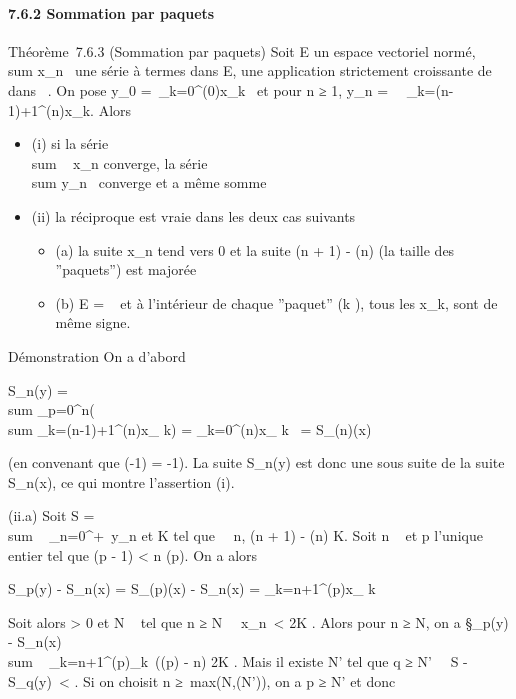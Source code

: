 \documentclass[]{article}
\begin{document}
\paragraph{7.6.2 Sommation par paquets}

Théorème~7.6.3 (Sommation par paquets) Soit E un espace vectoriel normé,
\\sum  x_n~ une
série à termes dans E, \phi une application strictement croissante de ~
dans ~. On pose y_0 =\
\sum  _k=0^\phi(0)x_k~ et
pour n ≥ 1, y_n =\
\sum ~
_k=\phi(n-1)+1^\phi(n)x_k. Alors

\begin{itemize}
\itemsep1pt\parskip0pt
\item
  (i) si la série \\sum ~
  x_n converge, la série
  \\sum  y_n~
  converge et a même somme
\item
  (ii) la réciproque est vraie dans les deux cas suivants

  \begin{itemize}
  \itemsep1pt\parskip0pt
  \item
    (a) la suite x_n tend vers 0 et la suite \phi(n + 1) - \phi(n)
    (la taille des ''paquets'') est majorée
  \item
    (b) E = ~ et à l'intérieur de chaque ''paquet'' (k ), tous les x_k, sont de même signe.
  \end{itemize}
\end{itemize}

Démonstration On a d'abord

S_n(y) = \\sum
_p=0^n(\\sum
_k=\phi(n-1)+1^\phi(n)x_ k) =
\sum _k=0^\phi(n)x_ k~ =
S_\phi(n)(x)

(en convenant que \phi(-1) = -1). La suite S_n(y) est donc une
sous suite de la suite S_n(x), ce qui montre l'assertion (i).

(ii.a) Soit S = \\sum ~
_n=0^+\infty~y_n et K tel que
\forall~~n, \phi(n + 1) - \phi(n) \leq K. Soit n \in {}~ et p
l'unique entier tel que \phi(p - 1) < n \leq \phi(p). On a alors

S_p(y) - S_n(x) = S_\phi(p)(x) - S_n(x)
= \sum _k=n+1^\phi(p)x_ k~

Soit alors \epsilon > 0 et N \in {}~ tel que n ≥ N
\rigtharrow~_n\
< \epsilon {}K . Alors pour n ≥ N, on a
\S_p(y) -
S_n(x)\
\leq\\sum ~
_k=n+1^\phi(p)\x_k\
\leq (\phi(p) - n) \epsilon \over 2K \leq \epsilon \over
2 . Mais il existe N' tel que q ≥ N' \rigtharrow~\ S -
S_q(y)\ < \epsilon
\over 2 . Si on choisit n ≥\
max(N,\phi(N')), on a p ≥ N' et donc
\end{document}
